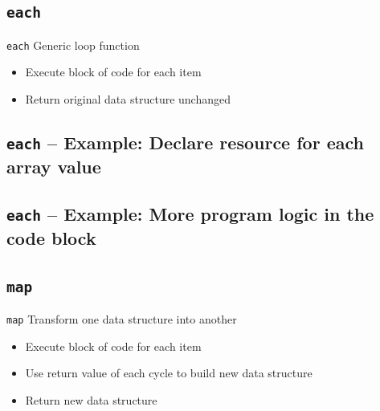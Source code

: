 \documentclass[english,aspectratio=43,nohandout]{beamer}
\begin{document}
\subsection{\texttt{each}}
\begin{frame}{\insertsection}{\insertsubsection}

\begin{block}{\texttt{each}}
Generic loop function
\end{block}

\vspace{\baselineskip}\pause

\begin{itemize}
\item Execute block of code for each item
\item Return original data structure unchanged
\end{itemize}
\end{frame}

\subsection{\texttt{each} -- Example: Declare resource for each array value}
\begin{frame}{\insertsection}{\insertsubsection}

\end{frame}

\subsection{\texttt{each} -- Example: More program logic in the code block}
\begin{frame}{\insertsection}{\insertsubsection}

\end{frame}

\subsection{\texttt{map}}
\begin{frame}{\insertsection}{\insertsubsection}

\begin{block}{\texttt{map}}
Transform one data structure into another
\end{block}

\vspace{\baselineskip}\pause

\begin{itemize}
\item Execute block of code for each item
\item Use return value of each cycle to build new data structure
\item Return new data structure
\end{itemize}
\end{frame}
\end{document}
